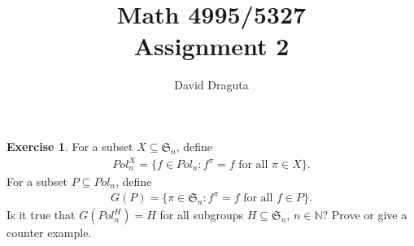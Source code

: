 \documentclass[12pt]{extarticle}
\title{ Math 4995/5327
  \\
  Assignment 2}
\author{David Draguta}
\newcommand{\set}[1]{\{#1\}}
\newcommand{\N}{\mathbb{N}}
\newcommand{\<}{\langle}
\renewcommand{\>}{\rangle}
\theoremstyle{definition}
\newtheorem{exercise}{Exercise}
\begin{document}
\maketitle

\begin{exercise}
  For a subset $X \subseteq \mathfrak{S}_n$, define
  \begin{align*}
    Pol_n^{X} = \set{f \in Pol_n: f^{\pi} = f \text{ for all } \pi \in X}.
  \end{align*}
  For a subset $P \subseteq Pol_n$, define
  \begin{align*}
    G(P) = \set{\pi \in \mathfrak{S}_n: f^{\pi} = f \text{ for all } f \in P}.
  \end{align*}
  Is it true that $G(Pol_n^H) = H$ for all subgroups $H \subseteq \mathfrak{S}_n$, $n \in \N$? Prove or give a counter example. 
\end{exercise}
\end{document}
